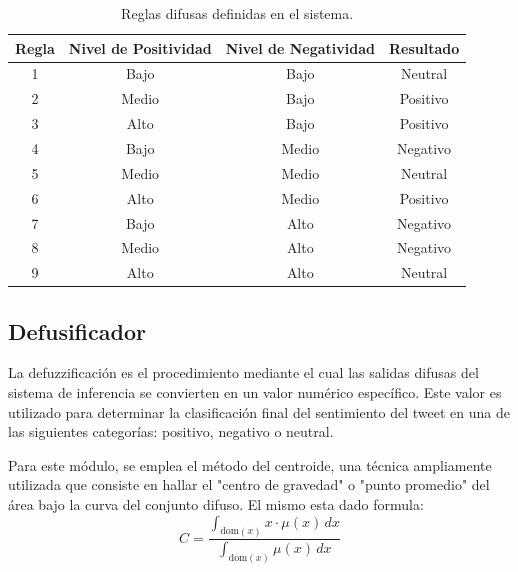 \documentclass[sigconf, review=false, nonacm]{acmart}
\begin{document}
\begin{table}[h!]
	\centering
	\begin{tabular}{|c|c|c|c|}
		\hline
		\textbf{Regla} & \textbf{Nivel de Positividad} & \textbf{Nivel de Negatividad} & \textbf{Resultado} \\ \hline
		1              & Bajo                          & Bajo                          & Neutral            \\ \hline
		2              & Medio                         & Bajo                          & Positivo           \\ \hline
		3              & Alto                          & Bajo                          & Positivo           \\ \hline
		4              & Bajo                          & Medio                         & Negativo           \\ \hline
		5              & Medio                         & Medio                         & Neutral            \\ \hline
		6              & Alto                          & Medio                         & Positivo           \\ \hline
		7              & Bajo                          & Alto                          & Negativo           \\ \hline
		8              & Medio                         & Alto                          & Negativo           \\ \hline
		9              & Alto                          & Alto                          & Neutral            \\ \hline
	\end{tabular}
	\caption{Reglas difusas definidas en el sistema.}
	\label{table:reglas_difusas}
\end{table}

\subsection{Defusificador}
La defuzzificación es el procedimiento mediante el cual las salidas difusas del sistema de inferencia se
convierten en un valor numérico específico. Este valor es utilizado para determinar la clasificación final del
sentimiento del tweet en una de las siguientes categorías: positivo, negativo o neutral.

Para este módulo, se emplea el método del centroide, una técnica ampliamente utilizada que consiste en hallar
el "centro de gravedad" o "punto promedio" del área bajo la curva del conjunto difuso. El mismo esta dado
formula:
$$
	C = \frac{\int_{\text{dom}(x)} x \cdot \mu(x) \, dx}{\int_{\text{dom}(x)} \mu(x) \, dx}
$$
\end{document}
